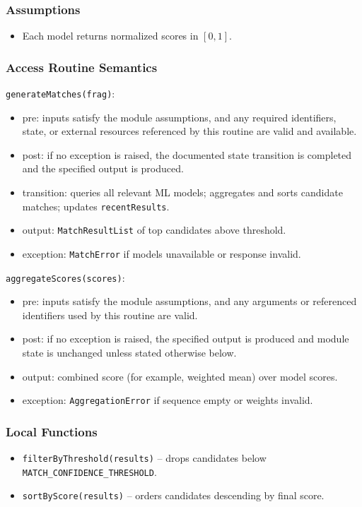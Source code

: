 \documentclass[12pt, titlepage]{article}
\begin{document}
\subsubsection{Assumptions}
\begin{itemize}
    \item Each model returns normalized scores in \([0, 1]\).
\end{itemize}

\subsubsection{Access Routine Semantics}

\noindent \texttt{generateMatches(frag)}:
\begin{itemize}
    \item pre: inputs satisfy the module assumptions, and any required identifiers, state, or external resources referenced by this routine are valid and available.
    \item post: if no exception is raised, the documented state transition is completed and the specified output is produced.
    \item transition: queries all relevant ML models; aggregates and sorts candidate matches; updates \texttt{recentResults}.
    \item output: \texttt{MatchResultList} of top candidates above threshold.
    \item exception: \texttt{MatchError} if models unavailable or response invalid.
\end{itemize}

\noindent \texttt{aggregateScores(scores)}:
\begin{itemize}
    \item pre: inputs satisfy the module assumptions, and any arguments or referenced identifiers used by this routine are valid.
    \item post: if no exception is raised, the specified output is produced and module state is unchanged unless stated otherwise below.
    \item output: combined score (for example, weighted mean) over model scores.
    \item exception: \texttt{AggregationError} if sequence empty or weights invalid.
\end{itemize}

\subsubsection{Local Functions}
\begin{itemize}
    \item \texttt{filterByThreshold(results)} – drops candidates below \texttt{MATCH\_CONFIDENCE\_THRESHOLD}.
    \item \texttt{sortByScore(results)} – orders candidates descending by final score.
\end{itemize}
\end{document}
